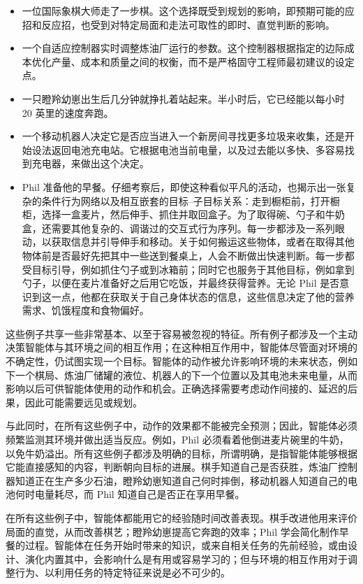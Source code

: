 \documentclass[UTF8, 12pt, fontset=fandol, oneside]{ctexart}
\begin{document}
\begin{itemize}
\item 一位国际象棋大师走了一步棋。这个选择既受到规划的影响，即预期可能的应招和反应招，也受到对特定局面和走法可取性的即时、直觉判断的影响。

\item 一个自适应控制器实时调整炼油厂运行的参数。这个控制器根据指定的边际成本优化产量、成本和质量之间的权衡，而不是严格固守工程师最初建议的设定点。

\item 一只瞪羚幼崽出生后几分钟就挣扎着站起来。半小时后，它已经能以每小时 20 英里的速度奔跑。

\item 一个移动机器人决定它是否应当进入一个新房间寻找更多垃圾来收集，还是开始设法返回电池充电站。它根据电池当前电量，以及过去能以多快、多容易找到充电器，来做出这个决定。

\item Phil 准备他的早餐。仔细考察后，即使这种看似平凡的活动，也揭示出一张复杂的条件行为网络以及相互嵌套的目标--子目标关系：走到橱柜前，打开橱柜，选择一盒麦片，然后伸手、抓住并取回盒子。为了取得碗、勺子和牛奶盒，还需要其他复杂的、调谐过的交互式行为序列。每一步都涉及一系列眼动，以获取信息并引导伸手和移动。关于如何搬运这些物体，或者在取得其他物体前是否最好先把其中一些送到餐桌上，人会不断做出快速判断。每一步都受目标引导，例如抓住勺子或到冰箱前；同时它也服务于其他目标，例如拿到勺子，以便在麦片准备好之后用它吃饭，并最终获得营养。无论 Phil 是否意识到这一点，他都在获取关于自己身体状态的信息，这些信息决定了他的营养需求、饥饿程度和食物偏好。
\end{itemize}

这些例子共享一些非常基本、以至于容易被忽视的特征。所有例子都涉及一个主动决策智能体与其环境之间的相互作用；在这种相互作用中，智能体尽管面对环境的不确定性，仍试图实现一个目标。智能体的动作被允许影响环境的未来状态，例如下一个棋局、炼油厂储罐的液位、机器人的下一个位置以及其电池未来电量，从而影响以后可供智能体使用的动作和机会。正确选择需要考虑动作间接的、延迟的后果，因此可能需要远见或规划。

与此同时，在所有这些例子中，动作的效果都不能被完全预测；因此，智能体必须频繁监测其环境并做出适当反应。例如，Phil 必须看着他倒进麦片碗里的牛奶，以免牛奶溢出。所有这些例子都涉及明确的目标，所谓明确，是指智能体能够根据它能直接感知的内容，判断朝向目标的进展。棋手知道自己是否获胜，炼油厂控制器知道正在生产多少石油，瞪羚幼崽知道自己何时摔倒，移动机器人知道自己的电池何时电量耗尽，而 Phil 知道自己是否正在享用早餐。

在所有这些例子中，智能体都能用它的经验随时间改善表现。棋手改进他用来评价局面的直觉，从而改善棋艺；瞪羚幼崽提高它奔跑的效率；Phil 学会简化制作早餐的过程。智能体在任务开始时带来的知识，或来自相关任务的先前经验，或由设计、演化内置其中，会影响什么是有用或容易学习的；但与环境的相互作用对于调整行为、以利用任务的特定特征来说是必不可少的。
\end{document}
